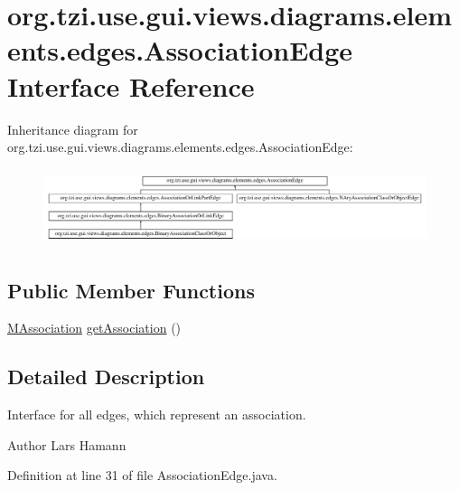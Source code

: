 \hypertarget{interfaceorg_1_1tzi_1_1use_1_1gui_1_1views_1_1diagrams_1_1elements_1_1edges_1_1_association_edge}{\section{org.\-tzi.\-use.\-gui.\-views.\-diagrams.\-elements.\-edges.\-Association\-Edge Interface Reference}
\label{interfaceorg_1_1tzi_1_1use_1_1gui_1_1views_1_1diagrams_1_1elements_1_1edges_1_1_association_edge}
}
Inheritance diagram for org.\-tzi.\-use.\-gui.\-views.\-diagrams.\-elements.\-edges.\-Association\-Edge\-:\begin{figure}[H]
\begin{center}
\leavevmode
\includegraphics[height=2.271805cm]{interfaceorg_1_1tzi_1_1use_1_1gui_1_1views_1_1diagrams_1_1elements_1_1edges_1_1_association_edge}
\end{center}
\end{figure}
\subsection*{Public Member Functions}
\begin{DoxyCompactItemize}
\item 
\hyperlink{interfaceorg_1_1tzi_1_1use_1_1uml_1_1mm_1_1_m_association}{M\-Association} \hyperlink{interfaceorg_1_1tzi_1_1use_1_1gui_1_1views_1_1diagrams_1_1elements_1_1edges_1_1_association_edge_aebefd778738df15adebc4d1dd523cec2}{get\-Association} ()
\end{DoxyCompactItemize}


\subsection{Detailed Description}
Interface for all edges, which represent an association. \begin{DoxyAuthor}{Author}
Lars Hamann 
\end{DoxyAuthor}


Definition at line 31 of file Association\-Edge.\-java.



